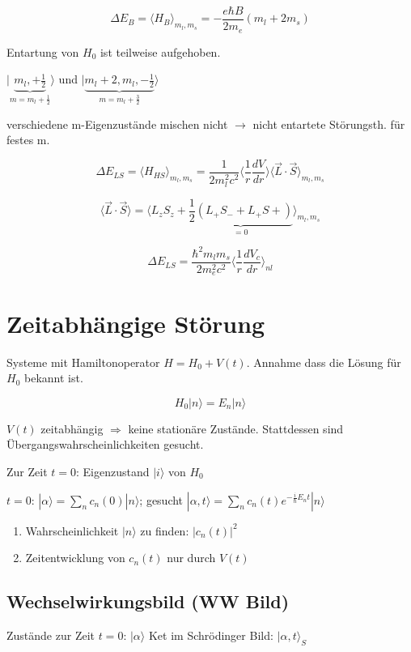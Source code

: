 \[ \Delta E_B = \langle H_B\rangle_{m_l,m_s} = -\frac{e\hbar B}{2m_e}(m_l + 2m_s)\]

Entartung von \(H_0\) ist teilweise aufgehoben.

\( |\underbrace{m_l,+\frac{1}{2}}_{m=m_l+\frac{1}{2}}\rangle\) und \(|\underbrace{ m_l+2,m_l,-\frac{1}{2}}_{m=m_l+\frac{3}{2}}\rangle\)

verschiedene m-Eigenzustände mischen nicht \(\rightarrow\) nicht entartete Störungsth. für festes m.

\[\Delta E_{LS} = \langle H_{HS} \rangle_{m_l,m_s} = \frac{1}{2m^2_lc^2}\langle \frac{1}{r} \frac{dV}{dr}\rangle\langle\vec L\cdot\vec S\rangle_{m_l,m_s}\]

\[\langle\vec L\cdot\vec S\rangle = \langle L_zS_z + \underbrace{\frac{1}{2}(L_+S_-+L_+S+)}_{=0}\rangle_{m_l,m_s}\]

\[ \boxed{\Delta E_{LS} = \frac{\hbar^2 m_lm_s}{2m^2_ec^2}\langle\frac{1}{r}\frac{dV_c}{dr}\rangle_{nl}}\]



\section{Zeitabhängige Störung}

Systeme mit Hamiltonoperator \(H=H_0+V(t)\). Annahme dass die Lösung für \(H_0\) bekannt ist.

\[ H_0 |n\rangle = E_n|n\rangle\]

\(V(t)\) zeitabhängig \(\Rightarrow\) keine stationäre Zustände. Stattdessen sind Übergangswahrscheinlichkeiten gesucht.

Zur Zeit \(t=0\): Eigenzustand \(|i\rangle\) von \(H_0\)

\(t=0\): \(|\alpha\rangle = \sum_n c_n(0)|n\rangle\); gesucht \(|\alpha,t\rangle = \sum_n c_n(t)e^{-\frac{i}{\hbar}E_n t} |n\rangle \)

\begin{enumerate}
\item Wahrscheinlichkeit \(|n\rangle\) zu finden: \(|c_n(t)|^2\)
\item Zeitentwicklung von \(c_n(t)\) nur durch \(V(t)\)
\end{enumerate}

\subsection{Wechselwirkungsbild (WW Bild)}

Zustände zur Zeit \(t=0\): \(|\alpha\rangle\) Ket im Schrödinger Bild: \(|\alpha,t\rangle_S\)

